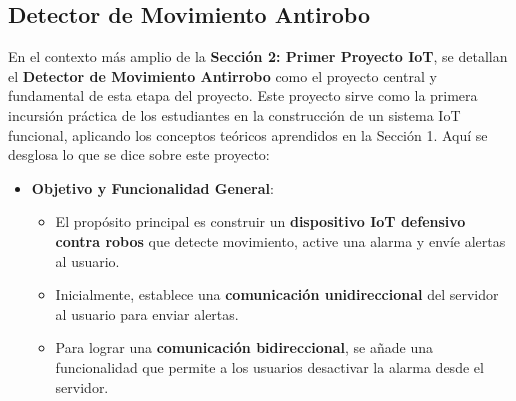 \documentclass{report}
\begin{document}
\subsection{Detector de Movimiento Antirobo}
En el contexto más amplio de la \textbf{Sección 2: Primer Proyecto IoT}, se  detallan el \textbf{Detector de Movimiento Antirrobo} como el proyecto 
central y fundamental de esta etapa del proyecto. Este proyecto sirve como la primera incursión práctica de los estudiantes en la construcción de un sistema 
IoT funcional, aplicando los conceptos teóricos aprendidos en la Sección 1. Aquí se desglosa lo que se  dice sobre este proyecto:

\begin{itemize}
    \item \textbf{Objetivo y Funcionalidad General}:
    \begin{itemize}
        \item El propósito principal es construir un \textbf{dispositivo IoT defensivo contra robos} que detecte movimiento, active una alarma y envíe alertas 
        al usuario.
        \item Inicialmente, establece una \textbf{comunicación unidireccional} del servidor al usuario para enviar alertas.
        \item Para lograr una \textbf{comunicación bidireccional}, se añade una funcionalidad que permite a los usuarios desactivar la alarma desde el 
        servidor.
    \end{itemize}
    

\end{itemize}
\end{document}
